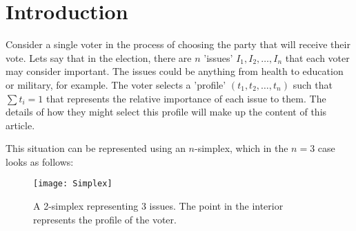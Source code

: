 \documentclass[
10pt, %
a4paper, %
oneside, %
headinclude,footinclude, %
BCOR5mm, %
]{scrartcl}
\begin{document}

{\let\thefootnote\relax{}}



\newpage %


\section{Introduction}

Consider a single voter in the process of choosing the party that will receive their vote. Lets say that in the election, there are $n$ 'issues' $I_1,I_2,\ldots,I_n$ that each voter may consider important. The issues could be anything from health to education or military, for example. The voter selects a 'profile' $(t_1,t_2,\ldots,t_n)$ such that $\sum{t_i}=1$ that represents the relative importance of each issue to them. The details of how they might select this profile will make up the content of this article.

This situation can be represented using an $n$-simplex, which in the $n=3$ case looks as follows:

\begin{figure}[h]
\centering 
\texttt{[image: Simplex]} 
\caption[A 2-simplex representing 3 issues]{A 2-simplex representing 3 issues. The point in the interior represents the profile of the voter.} %
\label{fig:simplex} 
\end{figure}
\end{document}
